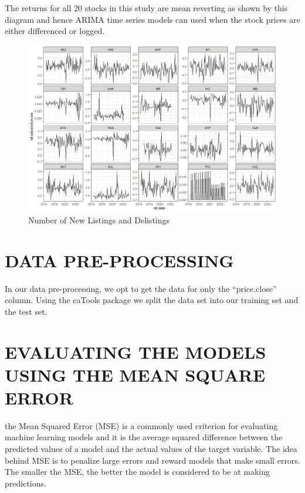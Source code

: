 \documentclass[
]{article}
\begin{document}
The returns for all 20 stocks in this study are mean reverting as shown
by this diagram and hence ARIMA time series models can used when the
stock prices are either differenced or logged.

\begin{figure}
\centering
\includegraphics{returns.png}
\caption{Number of New Listings and Delistings}
\end{figure}

\hypertarget{data-pre-processing}{%
\section{DATA PRE-PROCESSING}\label{data-pre-processing}}

In our data pre-processing, we opt to get the data for only the
``price.close'' column. Using the caTools package we split the data set
into our training set and the test set.

\hypertarget{evaluating-the-models-using-the-mean-square-error}{%
\section{EVALUATING THE MODELS USING THE MEAN SQUARE
ERROR}\label{evaluating-the-models-using-the-mean-square-error}}

the Mean Squared Error (MSE) is a commonly used criterion for evaluating
machine learning models and it is the average squared difference between
the predicted values of a model and the actual values of the target
variable. The idea behind MSE is to penalize large errors and reward
models that make small errors. The smaller the MSE, the better the model
is considered to be at making predictions.
\end{document}
